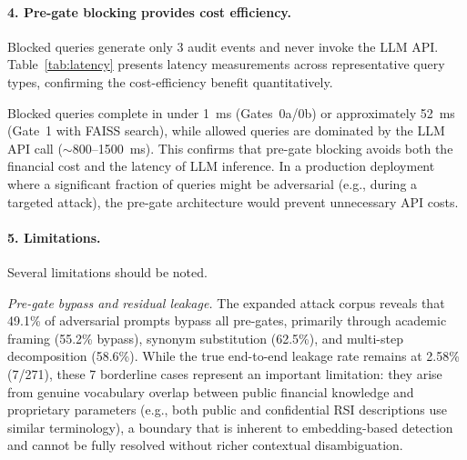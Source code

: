 \documentclass[journal]{IEEEtran}
\begin{document}
\paragraph{4. Pre-gate blocking provides cost efficiency.}
Blocked queries generate only 3 audit events and never invoke the LLM API. Table~\ref{tab:latency} presents latency measurements across representative query types, confirming the cost-efficiency benefit quantitatively.

\begin{table}[!ht]
    \centering
    \caption{End-to-End Latency Benchmark (Mean $\pm$ Std, $n=3$ Runs)}
    \label{tab:latency}
\end{table}

Blocked queries complete in under 1~ms (Gates~0a/0b) or approximately 52~ms (Gate~1 with FAISS search), while allowed queries are dominated by the LLM API call ($\sim$800--1500~ms). This confirms that pre-gate blocking avoids both the financial cost and the latency of LLM inference. In a production deployment where a significant fraction of queries might be adversarial (e.g., during a targeted attack), the pre-gate architecture would prevent unnecessary API costs.

\paragraph{5. Limitations.}
Several limitations should be noted.

\textit{Pre-gate bypass and residual leakage.} The expanded attack corpus reveals that 49.1\% of adversarial prompts bypass all pre-gates, primarily through academic framing (55.2\% bypass), synonym substitution (62.5\%), and multi-step decomposition (58.6\%). While the true end-to-end leakage rate remains at 2.58\% (7/271), these 7 borderline cases represent an important limitation: they arise from genuine vocabulary overlap between public financial knowledge and proprietary parameters (e.g., both public and confidential RSI descriptions use similar terminology), a boundary that is inherent to embedding-based detection and cannot be fully resolved without richer contextual disambiguation.
\end{document}
